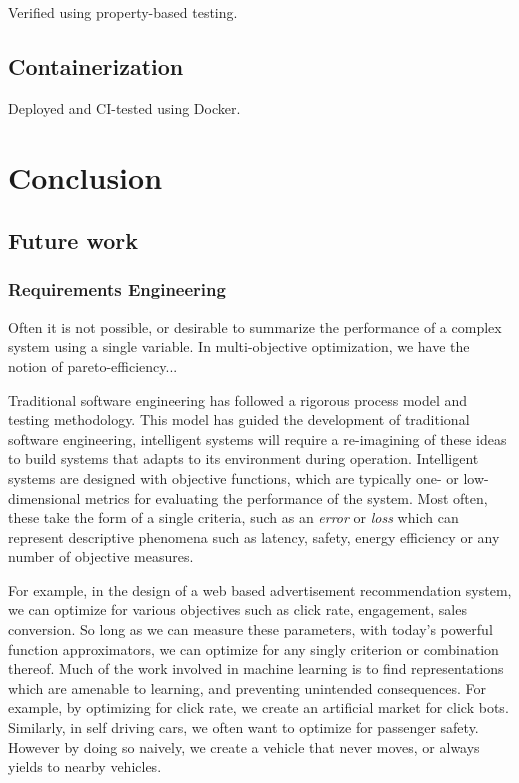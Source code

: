 \documentclass[12pt,initial,twoside,maitrise]{dms}
\numberwithin{equation}{section}
\numberwithin{table}{chapter}
\numberwithin{figure}{chapter}
\begin{document}
Verified using property-based testing.

\section{Containerization}

Deployed and CI-tested using Docker.

\chapter{Conclusion}\label{ch:conclusion}

\section{Future work}

\subsection{Requirements Engineering}

Often it is not possible, or desirable to summarize the performance of a complex system using a single variable. In multi-objective optimization, we have the notion of pareto-efficiency...

Traditional software engineering has followed a rigorous process model and testing methodology. This model has guided the development of traditional software engineering, intelligent systems will require a re-imagining of these ideas to build systems that adapts to its environment during operation. Intelligent systems are designed with objective functions, which are typically one- or low-dimensional metrics for evaluating the performance of the system. Most often, these take the form of a single criteria, such as an \textit{error} or \textit{loss} which can represent descriptive phenomena such as latency, safety, energy efficiency or any number of objective measures.

For example, in the design of a web based advertisement recommendation system, we can optimize for various objectives such as click rate, engagement, sales conversion. So long as we can measure these parameters, with today's powerful function approximators, we can optimize for any singly criterion or combination thereof. Much of the work involved in machine learning is to find representations which are amenable to learning, and preventing unintended consequences. For example, by optimizing for click rate, we create an artificial market for click bots. Similarly, in self driving cars, we often want to optimize for passenger safety. However by doing so naively, we create a vehicle that never moves, or always yields to nearby vehicles.
\end{document}
